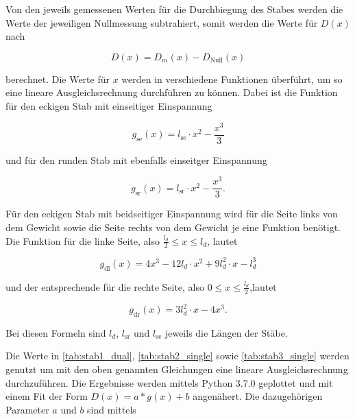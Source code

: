 Von den jeweils gemessenen Werten für die Durchbiegung des Stabes werden die Werte der jeweiligen Nullmessung subtrahiert, somit werden die Werte für $D(x)$ nach

\begin{equation}
  D(x) = D_m(x) - D_\text{Null}(x)
\end{equation}

berechnet. Die Werte für $x$ werden in verschiedene Funktionen überführt, um so eine lineare Ausgleichsrechnung durchführen zu können.
Dabei ist die Funktion für den eckigen Stab mit einseitiger Einspannung

\begin{equation}
  g_\text{se}(x) = l_\text{se} \cdot x^2 - \frac{x^3}{3}
\end{equation}

und für den runden Stab mit ebenfalls einseitger Einspannung

\begin{equation}
  g_\text{sr}(x) = l_\text{sr} \cdot x^2 - \frac{x^3}{3} .
\end{equation}

Für den eckigen Stab mit beidseitiger Einspannung wird für die Seite links von dem Gewicht sowie die Seite rechts von dem Gewicht je eine Funktion benötigt.
Die Funktion für die linke Seite, also $\frac{l_d}{2} \leq x \leq l_d$, lautet

\begin{equation}
  g_\text{dl}(x) = 4x^3 - 12l_d \cdot x^2 + 9l_d^2 \cdot x - l_d^3
\end{equation}

und der entsprechende für die rechte Seite, also $0 \leq x \leq \frac{l_d}{2}$,lautet

\begin{equation}
  g_\text{dr}(x) = 3 l_d^2 \cdot x - 4x^3.
\end{equation}

Bei diesen Formeln sind $l_d$, $l_\text{sr}$ und $l_\text{se}$ jeweils die Längen der Stäbe.





Die Werte in \autoref{tab:stab1_dual}, \autoref{tab:stab2_single} sowie \autoref{tab:stab3_single} werden genutzt um mit den oben genannten Gleichungen eine lineare Ausgleichsrechnung durchzuführen.
Die Ergebnisse werden mittels Python 3.7.0 geplottet und mit einem Fit der Form $D(x) = a * g(x) + b$ angenähert.
Die dazugehörigen Parameter $a$ und $b$ sind mittels

